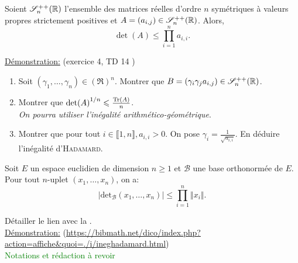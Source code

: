 \begin{tcolorbox}
    Soient $\mathscr{S}_n ^{++} (\mathbb{R})$ l'ensemble des matrices réelles d'ordre $n$ symétriques à valeurs propres strictement positives et $A = (a_{i,j}) \in \mathscr{S}_n ^{++} (\mathbb{R})$. Alors,
    $$\det(A) \leqslant \prod_{i=1}^{n} a_{i,i}.$$
\end{tcolorbox}

\underline{Démonstration:} (exercice 4, TD 14 \cite{acamanes})

\begin{enumerate}
    \item Soit $(\gamma_1, \dots, \gamma_n) \in (\Re)^n$. Montrer que $B = (\gamma_i \gamma_j a_{i,j}) \in \mathscr{S}_n^{++}(\mathbb{R})$. 
    \item Montrer que $\det(A)^{1/n} \leqslant \frac{\mathrm{Tr}(A)}{n}$. \\
    \emph{On pourra utiliser l'inégalité arithmético-géométrique}.
    

    \item Montrer que pour tout $i \in \llbracket 1, n \rrbracket, a_{i,i} > 0$. On pose $\gamma_i = \frac{1}{\sqrt{a_{i,i}}}$. En déduire l'inégalité d'\textsc{Hadamard}.
\end{enumerate}
\begin{tcolorbox}
    Soit $E$ un espace euclidien de dimension $n \geqslant 1$ et $\mathscr{B}$ une base orthonormée de $E$. Pour tout $n$-uplet $(x_1, \dots, x_n)$, on a:
    $$\left| \mathrm{det}_{\mathscr{B}}(x_1, \dots, x_n) \right| \leqslant \prod_{i=1}^{n} \Vert x_i \Vert.$$
\end{tcolorbox}

Détailler le lien avec la . \\

\underline{Démonstration:} (\url{https://bibmath.net/dico/index.php?action=affiche&quoi=./i/ineghadamard.html}) \\

\textcolor{green}{Notations et rédaction à revoir}

